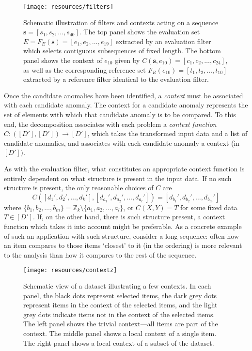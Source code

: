 \begin{figure}[htb]
    \begin{center}
        \texttt{[image: resources/filters]}
    \end{center}
    \caption{{\small Schematic illustration of filters and contexts acting on a sequence $\mathbf{s} = [s_1, s_2, \dots, s_{40}]$. The top panel shows the evaluation set $E = F_E(\mathbf{s}) = [e_1, e_2, \dots, e_{19}]$ extracted by an evaluation filter which selects contiguous subsequences of fixed length. The bottom panel shows the context of $e_{10}$ given by $C(\mathbf{s}, e_{10}) = [c_1, c_2, \dots, c_{24}]$, as well as the corresponding reference set $F_R(e_{10}) = [t_1, t_2, \dots, t_{10}]$ extracted by a reference filter identical to the evaluation filter.}}
\label{fig:filters}
\end{figure}

Once the candidate anomalies have been identified, a \emph{context} must be associated with each candidate anomaly. The context for a candidate anomaly represents the set of elements with which that candidate anomaly is to be compared. To this end, the decomposition associates with each problem a \emph{context function} $C: ([D'], [D']) \rightarrow [D']$, which takes the transformed input data and a list of candidate anomalies, and associates with each candidate anomaly a context (in $[D'])$.

As with the evaluation filter, what constitutes an appropriate context function is entirely dependent on what structure is present in the input data. If no such structure is present, the only reasonable choices of $C$ are
\[
    C([d_1', d_2', \dots, d_k'], [d_{a_1}', d_{a_2}', \dots, d_{a_l}']) = [d_{b_1}', d_{b_2}', \dots, d_{b_m}']
\]
where $\{b_1, b_2, \dots, b_m\} = \mathbb{Z}_k \setminus \{a_1, a_2, \dots, a_l\}$, or $C(X, Y) = T$ for some fixed data $T \in [D']$. If, on the other hand, there is such structure present, a context function which takes it into account might be preferable. As a concrete example of such an application with such structure, consider a long sequence: often how an item compares to those items `closest' to it (in the ordering) is more relevant to the analysis than how it compares to the rest of the sequence.

\begin{figure}[thb]
    \vspace{-4pt}
    \begin{center}
        \leavevmode
        \texttt{[image: resources/contextz]}
    \end{center}
    \vspace{-15pt}
    \caption{{\small Schematic view of a dataset illustrating a few contexts. In each panel, the black dots represent selected items, the dark grey dots represent items in the context of the selected items, and the light grey dots indicate items not in the context of the selected items. The left panel shows the trivial context---all items are part of the context. The middle panel shows a local context of a single item. The right panel shows a local context of a subset of the dataset.}}
\label{fig:contexts}
    \vspace{-5pt}
\end{figure}


